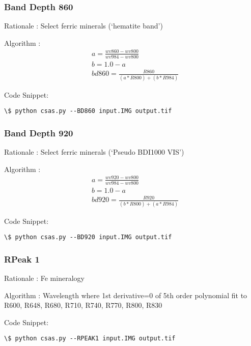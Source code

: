 \documentclass[letterpaper,10pt,english]{sphinxmanual}
\begin{document}
\subsubsection{Band Depth 860}
\label{Algorithms:band-depth-860}
Rationale : Select ferric minerals (`hematite band')

Algorithm : $$\begin{aligned}
& a = \frac{wv860 - wv800}{wv984 - wv800} \nonumber\\
& b = 1.0 - a \nonumber\\
& bd860 = \frac{R860}{(a*R800)+(b*R984)}
\end{aligned}$$

Code Snippet:

\begin{Verbatim}[commandchars=\\\{\}]
\$ python csas.py --BD860 input.IMG output.tif
\end{Verbatim}


\subsubsection{Band Depth 920}
\label{Algorithms:band-depth-920}
Rationale : Select ferric minerals (`Pseudo BDI1000 VIS')

Algorithm : $$\begin{aligned}
& a = \frac{wv920 - wv800}{wv984 - wv800} \nonumber\\
& b = 1.0 - a \nonumber\\
& bd920 = \frac{R920}{(b*R800)+(a*R984)}
\end{aligned}$$

Code Snippet:

\begin{Verbatim}[commandchars=\\\{\}]
\$ python csas.py --BD920 input.IMG output.tif
\end{Verbatim}


\subsubsection{RPeak 1}
\label{Algorithms:rpeak-1}
Rationale : Fe mineralogy

Algorithm : Wavelength where 1st derivative=0 of 5th order polynomial fit to R600, R648, R680, R710, R740, R770, R800, R830

Code Snippet:

\begin{Verbatim}[commandchars=\\\{\}]
\$ python csas.py --RPEAK1 input.IMG output.tif
\end{Verbatim}
\end{document}
